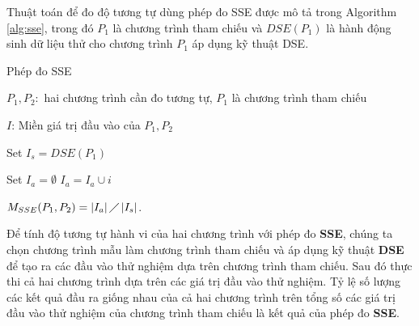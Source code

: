 Thuật toán để đo độ tương tự dùng phép đo SSE được mô tả trong
Algorithm \ref{alg:sse}, trong đó $P_1$ là chương trình tham chiếu và
$DSE(P_{1})$ là hành động sinh dữ liệu thử cho chương trình $P_1$ áp
dụng kỹ thuật DSE.

\begin{algorithm}[h]
  \caption{Phép đo SSE}
  \label{alg:sse}
  \begin{algorithmic}
  \item $P_{1}, P_{2}:$ hai chương trình cần đo tương tự, $P_1$ là chương trình tham chiếu
  \item $I$: Miền giá trị đầu vào của $P_{1}, P_{2}$
  \item Set $I_{s} = DSE(P_{1})$ 
  \item Set $I_{a} = \emptyset$
     \State
    $I_{a} = I_{a} \cup i$
    \EndIf
    \EndFor
  \item
    $M_{SSE}(P_{1}, P_{2}) = \left|I_{a}\right| \diagup
    \left|I_{s}\right| $.
  \end{algorithmic}
\end{algorithm}

Để tính độ tương tự hành vi của hai chương trình với phép đo
\textbf{SSE}, chúng ta chọn chương trình mẫu làm chương trình tham
chiếu và áp dụng kỹ thuật \textbf{DSE} để tạo ra các đầu vào thử
nghiệm dựa trên chương trình tham chiếu. Sau đó thực thi cả hai chương
trình dựa trên các giá trị đầu vào thử nghiệm. Tỷ lệ số lượng các kết
quả đầu ra giống nhau của cả hai chương trình trên tổng số các giá trị
đầu vào thử nghiệm của chương trình tham chiếu là kết quả của phép đo
\textbf{SSE}.

